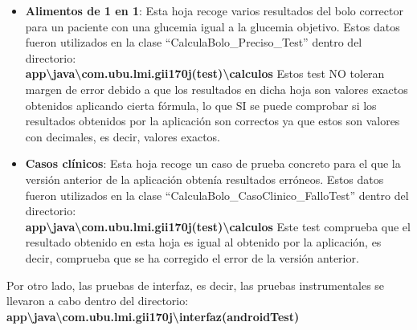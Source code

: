 \begin{itemize}
\begin{itemize}
	\item \textbf{Alimentos de 1 en 1}: Esta hoja recoge varios resultados del bolo corrector para un paciente con una glucemia igual a la glucemia objetivo. Estos datos fueron utilizados en la clase ``CalculaBolo\_Preciso\_Test'' dentro del directorio: \\ \textbf{app\textbackslash{java}\textbackslash{com.ubu.lmi.gii170j(test)}\textbackslash{calculos}}
	Estos test NO toleran margen de error debido a que los resultados en dicha hoja son valores exactos obtenidos aplicando cierta fórmula, lo que SI se puede comprobar si los resultados obtenidos por la aplicación son correctos ya que estos son valores con decimales, es decir, valores exactos.
	\item \textbf{Casos clínicos}: Esta hoja recoge un caso de prueba concreto para el que la versión anterior de la aplicación obtenía resultados erróneos. Estos datos fueron utilizados en la clase ``CalculaBolo\_CasoClinico\_FalloTest'' dentro del directorio: \\ \textbf{app\textbackslash{java}\textbackslash{com.ubu.lmi.gii170j(test)}\textbackslash{calculos}}
	Este test comprueba que el resultado obtenido en esta hoja es igual al obtenido por la aplicación, es decir, comprueba que se ha corregido el error de la versión anterior.
\end{itemize}
	
Por otro lado, las pruebas de interfaz, es decir, las pruebas instrumentales se llevaron a cabo dentro del directorio: \\
\textbf{app\textbackslash{java}\textbackslash{com.ubu.lmi.gii170j}\textbackslash{interfaz(androidTest)}}
\end{itemize}
	
